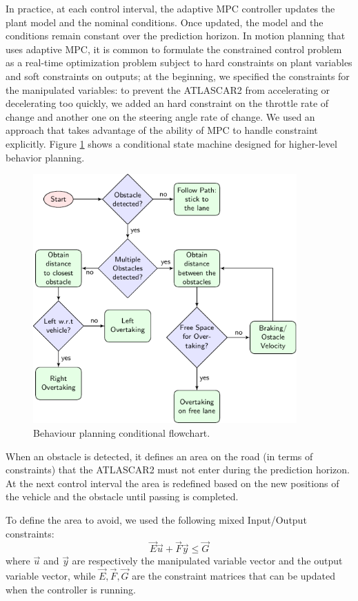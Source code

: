 In practice, at each control interval, the adaptive MPC controller updates the plant model and the nominal conditions. Once updated, the model and the conditions remain constant over the prediction horizon. In motion planning that uses adaptive MPC, it is common to formulate the constrained control problem as a real-time optimization problem subject to hard constraints on plant variables and soft constraints on outputs; at the beginning, we specified the constraints for the manipulated variables: to prevent the ATLASCAR2 from accelerating or decelerating too quickly, we added an hard constraint on the throttle rate of change and another one on the steering angle rate of change. We used an approach that takes advantage of the ability of MPC to handle constraint explicitly. Figure \ref{fig:flowchart} shows a conditional state machine designed for higher-level behavior planning.
\begin{figure}[!t]
	\centering
	\includegraphics[width=0.90\textwidth]{./figure/flowchart/flowchart.pdf}
	\caption{Behaviour planning conditional flowchart.}
	\label{fig:flowchart}
\end{figure}

When an obstacle is detected, it defines an area on the road (in terms of constraints) that the ATLASCAR2 must not enter during the prediction horizon. At the next control interval the area is redefined based on the new positions of the vehicle and the obstacle until passing is completed.

To define the area to avoid, we used the following mixed Input/Output constraints:
\begin{equation}
\label{eqn:mixed_IO_constraints}
\vec{E}\vec{u}+\vec{F}\vec{y}\leq \vec{G}
\end{equation}
where $\vec{u}$ and $\vec{y}$ are respectively the manipulated variable vector and the output variable vector, while $\vec{E},\vec{F},\vec{G}$ are the constraint matrices that can be updated when the controller is running. 

